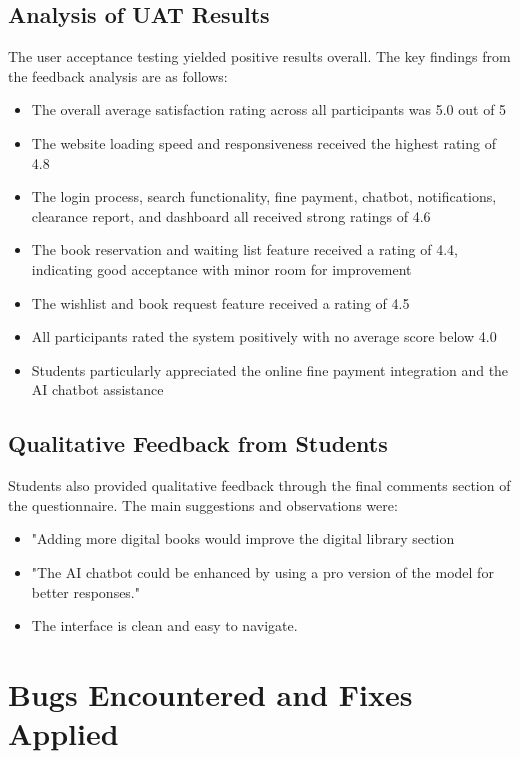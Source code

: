 \documentclass[12pt,a4paper]{report}
\begin{document}
\subsection{Analysis of UAT Results}

The user acceptance testing yielded positive results overall. The key findings from the feedback analysis are as follows:

\begin{itemize}
    \item The overall average satisfaction rating across all participants was 5.0 out of 5
    \item The website loading speed and responsiveness received the highest rating of 4.8
    \item The login process, search functionality, fine payment, chatbot, notifications, clearance report, and dashboard all received strong ratings of 4.6
    \item The book reservation and waiting list feature received a rating of 4.4, indicating good acceptance with minor room for improvement
    \item The wishlist and book request feature received a rating of 4.5
    \item All participants rated the system positively with no average score below 4.0
    \item Students particularly appreciated the online fine payment integration and the AI chatbot assistance
\end{itemize}

\subsection{Qualitative Feedback from Students}

Students also provided qualitative feedback through the final comments section of the questionnaire. The main suggestions and observations were:

\begin{itemize}
        \item "Adding more digital books would improve the digital library section
        \item "The AI chatbot could be enhanced by using a pro version of the model for better responses."
         \item The interface is clean and easy to navigate.
\end{itemize}

\section{Bugs Encountered and Fixes Applied}
\end{document}
